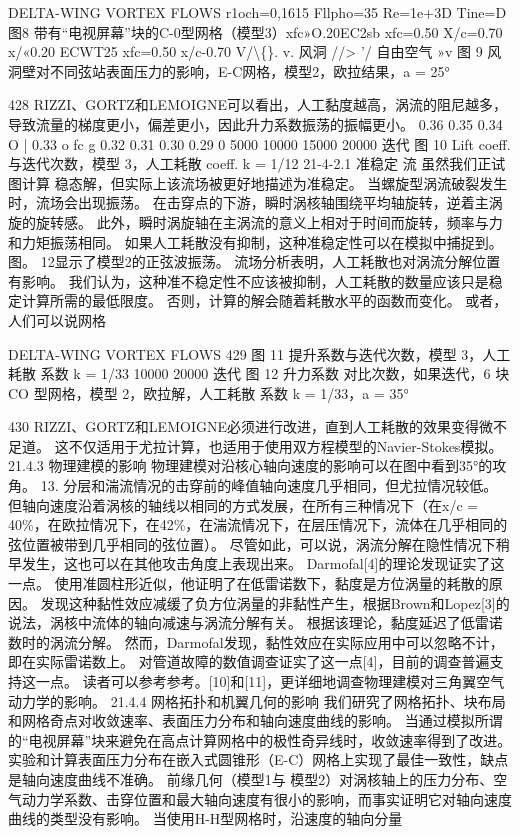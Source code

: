 \documentclass[UTF8,11pt,a4paper,openany,fontset=fandol]{ctexbook}
\begin{document}
DELTA-WING VORTEX FLOWS r1och=0,1615 Fllpho=35 Re=1e+3D Tine=D 图8 带有“电视屏幕”块的C-0型网格（模型3）xfc»O.20EC2sb xfc=0.50 X/c=0.70 x/«0.20 ECWT25 xfc=0.50 x/c-0.70 V/\textbackslash\{\}. v. 风洞 //> '/ 自由空气 »v 图 9 风洞壁对不同弦站表面压力的影响，E-C网格，模型2，欧拉结果，a = 25°

428 RIZZI、GORTZ和LEMOIGNE可以看出，人工黏度越高，涡流的阻尼越多，导致流量的梯度更小，偏差更小，因此升力系数振荡的振幅更小。 0.36 0.35 0.34 O | 0.33 o fc g 0.32 0.31 0.30 0.29 0 5000 10000 15000 20000 迭代 图 10 Lift coeff. 与迭代次数，模型 3，人工耗散 coeff. k = 1/12 21-4-2.1 准稳定 流 虽然我们正试图计算 稳态解，但实际上该流场被更好地描述为准稳定。 当螺旋型涡流破裂发生时，流场会出现振荡。 在击穿点的下游，瞬时涡核轴围绕平均轴旋转，逆着主涡旋的旋转感。 此外，瞬时涡旋轴在主涡流的意义上相对于时间而旋转，频率与力和力矩振荡相同。 如果人工耗散没有抑制，这种准稳定性可以在模拟中捕捉到。 图。 12显示了模型2的正弦波振荡。 流场分析表明，人工耗散也对涡流分解位置有影响。 我们认为，这种准不稳定性不应该被抑制，人工耗散的数量应该只是稳定计算所需的最低限度。 否则，计算的解会随着耗散水平的函数而变化。 或者，人们可以说网格

DELTA-WING VORTEX FLOWS 429 图 11 提升系数与迭代次数，模型 3，人工耗散 系数 k = 1/33 10000 20000 迭代 图 12 升力系数 对比次数，如果迭代，6 块 CO 型网格，模型 2，欧拉解，人工耗散 系数 k = 1/33，a = 35°

430 RIZZI、GORTZ和LEMOIGNE必须进行改进，直到人工耗散的效果变得微不足道。 这不仅适用于尤拉计算，也适用于使用双方程模型的Navier-Stokes模拟。 21.4.3 物理建模的影响 物理建模对沿核心轴向速度的影响可以在图中看到35°的攻角。 13. 分层和湍流情况的击穿前的峰值轴向速度几乎相同，但尤拉情况较低。 但轴向速度沿着涡核的轴线以相同的方式发展，在所有三种情况下（在x/c = 40\%，在欧拉情况下，在42\%，在湍流情况下，在层压情况下，流体在几乎相同的弦位置被带到几乎相同的弦位置）。 尽管如此，可以说，涡流分解在隐性情况下稍早发生，这也可以在其他攻击角度上表现出来。 Darmofal[4]的理论发现证实了这一点。 使用准圆柱形近似，他证明了在低雷诺数下，黏度是方位涡量的耗散的原因。 发现这种黏性效应减缓了负方位涡量的非黏性产生，根据Brown和Lopez[3]的说法，涡核中流体的轴向减速与涡流分解有关。 根据该理论，黏度延迟了低雷诺数时的涡流分解。 然而，Darmofal发现，黏性效应在实际应用中可以忽略不计，即在实际雷诺数上。 对管道故障的数值调查证实了这一点[4]，目前的调查普遍支持这一点。 读者可以参考参考。[10]和[11]，更详细地调查物理建模对三角翼空气动力学的影响。 21.4.4 网格拓扑和机翼几何的影响 我们研究了网格拓扑、块布局和网格奇点对收敛速率、表面压力分布和轴向速度曲线的影响。 当通过模拟所谓的“电视屏幕”块来避免在高点计算网格中的极性奇异线时，收敛速率得到了改进。 实验和计算表面压力分布在嵌入式圆锥形（E-C）网格上实现了最佳一致性，缺点是轴向速度曲线不准确。 前缘几何（模型1与 模型2）对涡核轴上的压力分布、空气动力学系数、击穿位置和最大轴向速度有很小的影响，而事实证明它对轴向速度曲线的类型没有影响。 当使用H-H型网格时，沿速度的轴向分量
\end{document}
